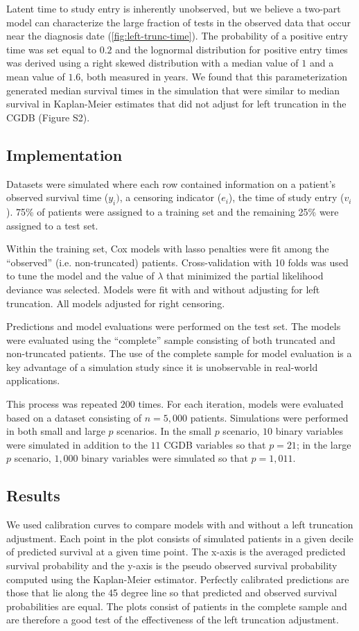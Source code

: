 \documentclass[11pt,final,fleqn]{article}\usepackage[]{graphicx}\usepackage[]{color}
\theoremstyle{plain}
\begin{document}
Latent time to study entry is inherently unobserved, but we believe a two-part model can characterize the large fraction of tests in the observed data that occur near the diagnosis date  (\autoref{fig:left-trunc-time}). The probability of a positive entry time was set equal to $0.2$ and the lognormal distribution for positive entry times was derived using a right skewed distribution with a median value of $1$ and a mean value of $1.6$, both measured in years.  We found that this parameterization generated median survival times in the simulation that were similar to median survival in Kaplan-Meier estimates that did not adjust for left truncation in the CGDB (Figure S2).

\subsection{Implementation}
Datasets were simulated where each row contained information on a patient's observed survival time ($y_i)$, a censoring indicator ($e_i$), the time of study entry ($v_i$). 75\%  of patients were assigned to a training set and the remaining 25\% were assigned to a test set. 

Within the training set, Cox models with lasso penalties were fit among the ``observed'' (i.e. non-truncated) patients. Cross-validation with 10 folds was used to tune the  model and the value of $\lambda$ that minimized the partial likelihood deviance was selected. Models were fit with and without adjusting for left truncation. All models adjusted for right censoring.

Predictions and model evaluations were performed on the test set. The models were evaluated using the ``complete'' sample consisting of both truncated and non-truncated patients. The use of the complete sample for model evaluation is a key advantage of a simulation study since it is unobservable in real-world applications.

This process was repeated $200$ times. For each iteration, models were evaluated based on a dataset consisting of $n=5,000$ patients. Simulations were performed in both small and large $p$ scenarios. In the small $p$ scenario, $10$ binary variables were simulated in addition to the $11$ CGDB variables so that $p=21$; in the large $p$ scenario, $1,000$ binary variables were simulated so that $p=1,011$.

\subsection{Results}
We used calibration curves \cite{harrell2015regression} to compare models with and without a left truncation adjustment. Each point in the plot consists of simulated patients in a given decile of predicted survival at a given time point. The x-axis is the averaged predicted survival probability and the y-axis is the pseudo observed survival probability computed using the Kaplan-Meier estimator. Perfectly calibrated predictions are those that lie along the 45 degree line so that predicted and observed survival probabilities are equal. The plots consist of patients in the complete sample and are therefore a good test of the effectiveness of the left truncation adjustment.
\end{document}
